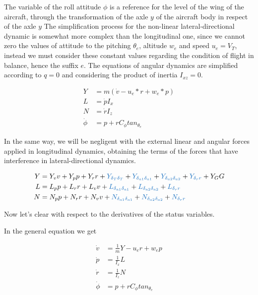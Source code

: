The variable of the roll attitude $\phi$ is a reference for the level of the wing of the aircraft, through the transformation of the axle $y$ of the aircraft body in respect of the axle $y$ The simplification process for the non-linear lateral-directional dynamic is somewhat more complex than the longitudinal one, since we cannot zero the values of attitude to the pitching $\theta_{e}$, altitude $w_{e}$ and speed $u_{e}=V_{T}$, instead we must consider these constant values regarding the condition of flight in balance, hence the suffix $e$. The equations of angular dynamics are simplified according to $q=0$ and \cite{Mohammad2020} considering the product of inertia $I_{xz}=0$. 

\begin{align} 
Y &= m (\dot v - u_{e}*r + w_{e}*p)\\
L &= \dot p I_x \\
N &=  \dot r I_z \\
\dot \phi &= p + r C_{\phi} tan_{\theta_{e}}
\end{align}

In the same way, we will be negligent with the external linear and angular forces applied in longitudinal dynamics, obtaining the terms of the forces that have interference in lateral-directional dynamics. 

\begin{align}
    Y &= Y_{v} v + Y_{p}p + Y_{r} r + \textcolor{RoyalBlue}{Y_{\delta_{T} \delta_{T}}} + \textcolor{RoyalBlue}{Y_{\delta_{a1} \delta_{a1}}} + \textcolor{RoyalBlue}{Y_{\delta_{a2} \delta_{a2}}}  + \textcolor{RoyalBlue}{Y_{\delta_{r}r}} + Y_{G} G \\
    L &= L_{p}p + L_{r}r + L_{v}v + \textcolor{RoyalBlue}{L_{\delta_{a1} \delta_{a1}}} + \textcolor{RoyalBlue}{L_{\delta_{a2} \delta_{a2}}}  + \textcolor{RoyalBlue}{L_{\delta_{r}r}} \\
    N &= N_{p}p + N_{r}r + N_{v}v + \textcolor{RoyalBlue}{N_{\delta_{a1} \delta_{a1}}} + \textcolor{RoyalBlue}{N_{\delta_{a2} \delta_{a2}}}  + \textcolor{RoyalBlue}{N_{\delta_{r}r}}
\end{align}


Now let's clear with respect to the derivatives of the status variables. 

In the general equation we get

\begin{align}
    \dot v & = \frac{1}{m}Y - u_{e} r + w_{e} p \\
    \dot p & = \frac{1}{I_x}L \\
    \dot r & = \frac{1}{I_z}N \\
    \dot \phi &= p + r C_{\phi} tan_{\theta_{e}}
\end{align}

